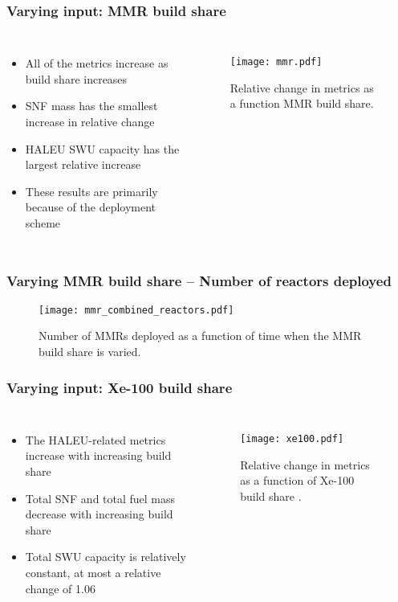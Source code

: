 \begin{frame}
    \frametitle{Varying input: MMR build share}
    \begin{columns}
        \column{4.5cm}
            \begin{itemize}
                \item All of the metrics increase as build share increases
                \item \gls{SNF} mass has the smallest increase in 
                      relative change
                \item \gls{HALEU} \gls{SWU} capacity has the largest relative increase 
                \item These results are primarily because of the deployment scheme    
            \end{itemize}
        \column{5.5cm}
            \begin{figure}
                \texttt{[image: mmr.pdf]}
                \caption{Relative change in metrics as a function MMR 
                build share.}
                \label{fig:mmr}
            \end{figure}

\end{columns}
\end{frame}

\begin{frame}
    \frametitle{Varying MMR build share -- Number of reactors deployed}
    \begin{figure}
        \centering
        \texttt{[image: mmr\_combined\_reactors.pdf]}
        \caption{Number of MMRs deployed as a function of time when the 
        MMR build share is varied.}
    \end{figure}
\end{frame}
\begin{frame}
    \frametitle{Varying input: Xe-100 build share}
    \begin{columns}
        \column{4cm}
            \begin{itemize}
                \item The \gls{HALEU}-related metrics increase
                      with increasing build share
                \item Total \gls{SNF} and total fuel mass decrease with 
                      increasing build share
                \item Total \gls{SWU} capacity is relatively constant, at most 
                      a relative change of 1.06
            \end{itemize}
        \column{6.5cm}
            \begin{figure}
                \texttt{[image: xe100.pdf]}
                \caption{Relative change in metrics as a function of Xe-100 
                build share \protect\cite{bachmann_sensitivity_2022}.}
                \label{fig:xe100}
            \end{figure}

\end{columns}
\end{frame}
   

